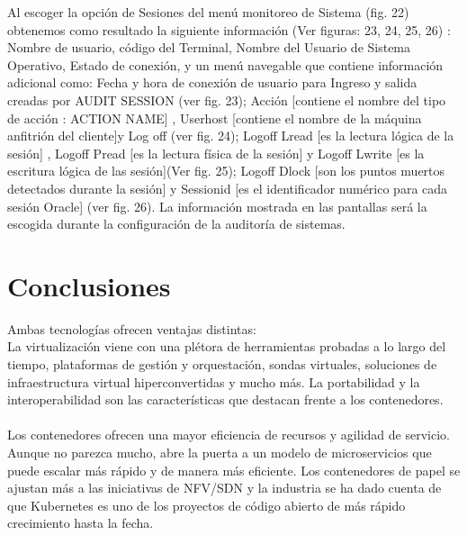 \documentclass[twoside,twocolumn]{article}
\begin{document}
\begin{flushright}
\begin{itemize}
Al escoger la opción de Sesiones del menú monitoreo de Sistema (fig. 22) obtenemos como resultado la siguiente información (Ver figuras: 23, 24, 25, 26) : Nombre de usuario, código del Terminal, Nombre del Usuario de Sistema Operativo, Estado de conexión, y un menú navegable que contiene información adicional como: Fecha y hora de conexión de usuario para Ingreso y salida creadas por AUDIT SESSION (ver fig. 23); Acción [contiene el nombre del tipo de acción : ACTION NAME] , Userhost [contiene el nombre de la máquina anfitrión del cliente]y Log off (ver fig. 24); Logoff Lread [es la lectura lógica de la sesión] , Logoff Pread [es la lectura física de la sesión] y Logoff Lwrite [es la escritura lógica de las sesión](Ver fig. 25); Logoff Dlock [son los puntos muertos detectados durante la sesión] y Sessionid [es el identificador numérico para cada sesión Oracle] (ver fig. 26). La información mostrada en las pantallas será la escogida durante la configuración de la auditoría de sistemas.
\section{Conclusiones}

Ambas tecnologías ofrecen ventajas distintas:
\textbf{}\\
La virtualización viene con una plétora de herramientas probadas a lo largo del tiempo, plataformas de gestión y orquestación, sondas virtuales, soluciones de infraestructura virtual hiperconvertidas y mucho más. La portabilidad y la interoperabilidad son las características que destacan frente a los contenedores.
\textbf{}\\
\textbf{}\\
Los contenedores ofrecen una mayor eficiencia de recursos y agilidad de servicio. Aunque no parezca mucho, abre la puerta a un modelo de microservicios que puede escalar más rápido y de manera más eficiente. Los contenedores de papel se ajustan más a las iniciativas de NFV/SDN y la industria se ha dado cuenta de que Kubernetes es uno de los proyectos de código abierto de más rápido crecimiento hasta la fecha.




\textbf{}\\
\textbf{}\\

\begin{thebibliography}{99} %




\end{thebibliography}
\end{itemize}
\end{flushright}
\end{document}
